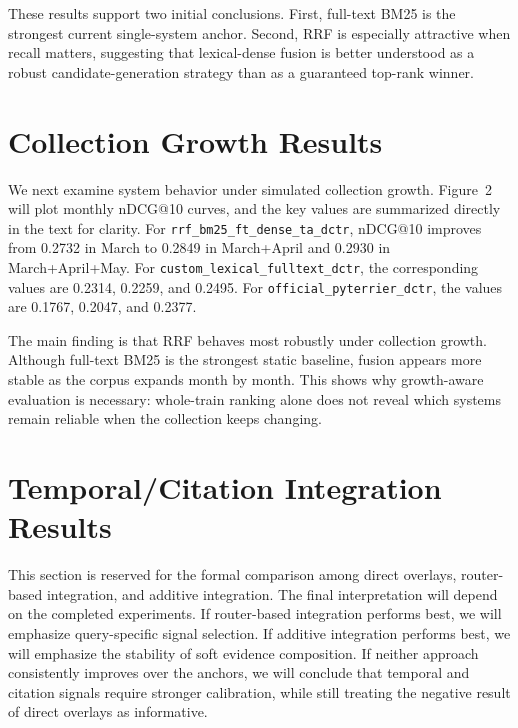 \documentclass[11pt]{article}
\begin{document}
These results support two initial conclusions. First, full-text BM25 is the strongest current single-system anchor. Second, RRF is especially attractive when recall matters, suggesting that lexical-dense fusion is better understood as a robust candidate-generation strategy than as a guaranteed top-rank winner.

\section{Collection Growth Results}

We next examine system behavior under simulated collection growth. Figure~2 will plot monthly nDCG@10 curves, and the key values are summarized directly in the text for clarity. For \texttt{rrf\_bm25\_ft\_dense\_ta\_dctr}, nDCG@10 improves from 0.2732 in March to 0.2849 in March+April and 0.2930 in March+April+May. For \texttt{custom\_lexical\_fulltext\_dctr}, the corresponding values are 0.2314, 0.2259, and 0.2495. For \texttt{official\_pyterrier\_dctr}, the values are 0.1767, 0.2047, and 0.2377.

The main finding is that RRF behaves most robustly under collection growth. Although full-text BM25 is the strongest static baseline, fusion appears more stable as the corpus expands month by month. This shows why growth-aware evaluation is necessary: whole-train ranking alone does not reveal which systems remain reliable when the collection keeps changing.

\section{Temporal/Citation Integration Results}

This section is reserved for the formal comparison among direct overlays, router-based integration, and additive integration. The final interpretation will depend on the completed experiments. If router-based integration performs best, we will emphasize query-specific signal selection. If additive integration performs best, we will emphasize the stability of soft evidence composition. If neither approach consistently improves over the anchors, we will conclude that temporal and citation signals require stronger calibration, while still treating the negative result of direct overlays as informative.
\end{document}
